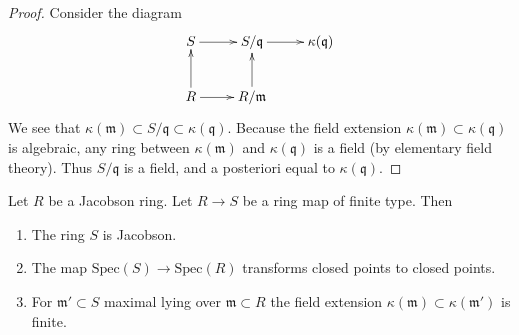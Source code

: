 \begin{proof}
Consider the diagram
$$
\xymatrix{
S \ar[r] & S/\mathfrak q \ar[r] & \kappa(\mathfrak q) \\
R \ar[r] \ar[u] & R/\mathfrak m \ar[u]
}
$$
We see that $\kappa(\mathfrak m) \subset S/\mathfrak q \subset
\kappa(\mathfrak q)$. Because the field extension
$\kappa(\mathfrak m) \subset \kappa(\mathfrak q)$
is algebraic, any ring between $\kappa(\mathfrak m)$
and $\kappa(\mathfrak q)$ is a field (by elementary
field theory). Thus $S/\mathfrak q$ is a field, and a posteriori equal
to $\kappa(\mathfrak q)$.
\end{proof}

\begin{proposition}
\label{proposition-Jacobson-permanence}
Let $R$ be a Jacobson ring. Let $R \to S$ be a
ring map of finite type. Then
\begin{enumerate}
\item The ring $S$ is Jacobson.
\item The map $\text{Spec}(S) \to \text{Spec}(R)$ transforms
closed points to closed points.
\item For $\mathfrak m' \subset S$ maximal lying over $\mathfrak m \subset R$
the field extension $\kappa(\mathfrak m) \subset \kappa(\mathfrak m')$
is finite.
\end{enumerate}
\end{proposition}

